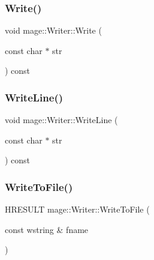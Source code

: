 \hypertarget{classmage_1_1_writer_a0ac4d904f988028361a99e1f25e273ab}{}\label{classmage_1_1_writer_a0ac4d904f988028361a99e1f25e273ab} 
\subsubsection{\texorpdfstring{Write()}{Write()}\hspace{0.1cm}{\footnotesize\ttfamily [3/3]}}
{\footnotesize\ttfamily void mage\+::\+Writer\+::\+Write (\begin{DoxyParamCaption}\item[{const char $\ast$}]{str }\end{DoxyParamCaption}) const\hspace{0.3cm}{\ttfamily [protected]}}

\hypertarget{classmage_1_1_writer_ab6f3d56fd4ff285af3a4bb292dba8271}{}\label{classmage_1_1_writer_ab6f3d56fd4ff285af3a4bb292dba8271} 
\subsubsection{\texorpdfstring{Write\+Line()}{WriteLine()}}
{\footnotesize\ttfamily void mage\+::\+Writer\+::\+Write\+Line (\begin{DoxyParamCaption}\item[{const char $\ast$}]{str }\end{DoxyParamCaption}) const\hspace{0.3cm}{\ttfamily [protected]}}

\hypertarget{classmage_1_1_writer_ae9250f340229ee80dc5c518045567f7d}{}\label{classmage_1_1_writer_ae9250f340229ee80dc5c518045567f7d} 
\subsubsection{\texorpdfstring{Write\+To\+File()}{WriteToFile()}}
{\footnotesize\ttfamily H\+R\+E\+S\+U\+LT mage\+::\+Writer\+::\+Write\+To\+File (\begin{DoxyParamCaption}\item[{const wstring \&}]{fname }\end{DoxyParamCaption})}



